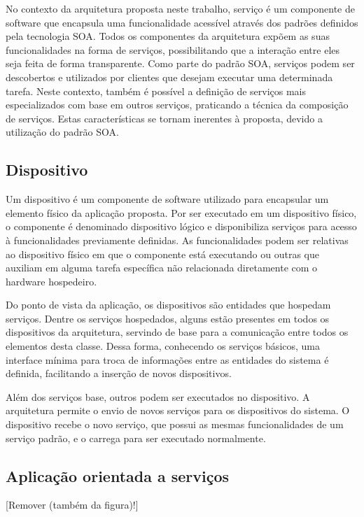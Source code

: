 No contexto da arquitetura proposta neste trabalho, serviço é um componente de software que
encapsula uma funcionalidade acessível através dos padrões definidos pela tecnologia \gls{SOA}.
Todos os componentes da arquitetura expõem as suas funcionalidades na forma de serviços,
possibilitando que a interação entre eles seja feita de forma transparente. Como parte do padrão
\gls{SOA}, serviços podem ser descobertos e utilizados por clientes que desejam executar uma
determinada tarefa. Neste contexto, também é possível a definição de serviços mais especializados
com base em outros serviços, praticando a técnica da composição de serviços. Estas características
se tornam inerentes à proposta, devido a utilização do padrão \gls{SOA}.


\subsection{Dispositivo}

Um dispositivo é um componente de software utilizado para encapsular um elemento físico da aplicação
proposta. Por ser executado em um dispositivo físico, o componente é denominado dispositivo lógico e
disponibiliza serviços para acesso à funcionalidades previamente definidas. As funcionalidades podem
ser relativas ao dispositivo físico em que o componente está executando ou outras que auxiliam em
alguma tarefa específica não relacionada diretamente com o hardware hospedeiro.

Do ponto de vista da aplicação, os dispositivos são entidades que hospedam serviços. Dentre os
serviços hospedados, alguns estão presentes em todos os dispositivos da arquitetura, servindo de
base para a comunicação entre todos os elementos desta classe. Dessa forma, conhecendo os serviços
básicos, uma interface mínima para troca de informações entre as entidades do sistema é definida,
facilitando a inserção de novos dispositivos.

Além dos serviços base, outros podem ser executados no dispositivo. A arquitetura permite o envio de
novos serviços para os dispositivos do sistema. O dispositivo recebe o novo serviço, que possui as
mesmas funcionalidades de um serviço padrão, e o carrega para ser executado normalmente.


\subsection{Aplicação orientada a serviços}

[Remover (também da figura)!]

